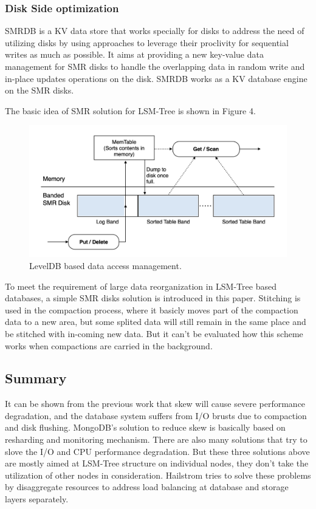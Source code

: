 \documentclass[a4paper,10pt,twoside]{article}
\begin{document}
\subsubsection{Disk Side optimization}
SMRDB \cite{SMRDB} is a KV data store that works specially for disks to address the need of utilizing disks by using approaches to leverage their proclivity for sequential writes as much as possible.
It aims at providing a new key-value data management for SMR disks to handle the overlapping data in random write and in-place updates operations on the disk.
SMRDB works as a KV database engine on the SMR disks. 
\par
The basic idea of SMR solution for LSM-Tree is shown in Figure 4.
\begin{figure}[h]
    \centering
	\includegraphics[scale=0.3]{SMR.png}
    \caption{ LevelDB based data access management.}
    \label{fig:mesh1}
\end{figure}
To meet the requirement of large data reorganization in LSM-Tree based databases, a simple SMR disks solution is introduced in this paper.
Stitching is used in the compaction process, where it basicly moves part of the compaction data to a new area, 
but some splited data will still remain in the same place and be stitched with in-coming new data.
But it can't be evaluated how this scheme works when compactions are carried in the background.

\subsection{Summary}
It can be shown from the previous work that skew will cause severe performance degradation, and the database system suffers from I/O brusts due to compaction and disk flushing.
MongoDB's solution to reduce skew is basically based on resharding and monitoring mechanism.
There are also many solutions that try to slove the I/O and CPU performance degradation.
But these three solutions above are mostly aimed at LSM-Tree structure on individual nodes, they don't take the utilization of other nodes in consideration.
Hailstrom tries to solve these problems by disaggregate resources to address load balancing at database and storage layers separately.
\end{document}
